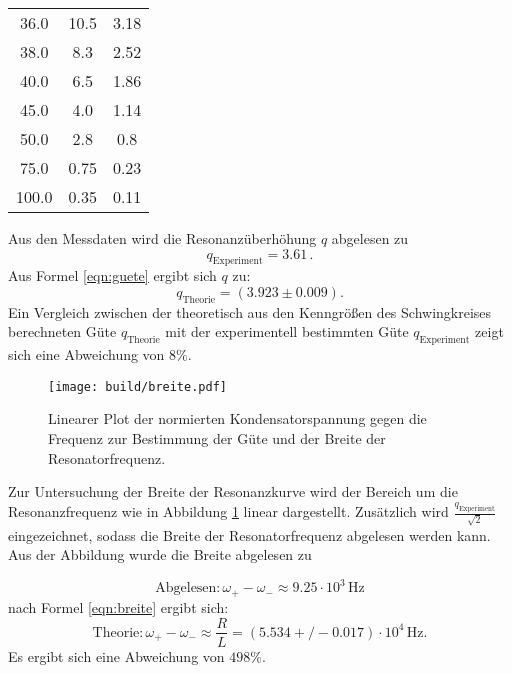 \begin{table}
\begin{tabular}{ccc}
		36.0                        & 10.5                      & 3.18                      \\
		38.0                        & 8.3                       & 2.52                      \\
		40.0                        & 6.5                       & 1.86                      \\
		45.0                        & 4.0                       & 1.14                      \\
		50.0                        & 2.8                       & 0.8                       \\
		75.0                        & 0.75                      & 0.23                      \\
		100.0                       & 0.35                      & 0.11                      \\
    \bottomrule
  \end{tabular}
\end{table}

Aus den Messdaten wird die Resonanzüberhöhung $q$ abgelesen zu
\begin{equation*}
	q_\mathrm{Experiment}= 3.61 \, .
\end{equation*}
Aus Formel \eqref{eqn:guete} ergibt sich $q$ zu:
\begin{equation*}
q_\mathrm{Theorie}= (3.923 \pm 0.009) .
\end{equation*}
Ein Vergleich zwischen der theoretisch aus den Kenngrößen des Schwingkreises berechneten Güte $q_\mathrm{Theorie}$ mit der experimentell bestimmten Güte $q_\mathrm{Experiment}$ zeigt sich eine Abweichung von $8\%$.
\begin{figure}
  \texttt{[image: build/breite.pdf]}
  \caption{Linearer Plot der normierten Kondensatorspannung gegen die Frequenz zur Bestimmung der Güte und der Breite der Resonatorfrequenz.}
  \label{fig:breite}
\end{figure}
Zur Untersuchung der Breite der Resonanzkurve wird der Bereich um die Resonanzfrequenz
wie in Abbildung \ref{fig:breite} linear dargestellt.
Zusätzlich wird $\frac{q_\mathrm{Experiment}}{\sqrt{2}}$ eingezeichnet, sodass die Breite der Resonatorfrequenz abgelesen werden kann.
Aus der Abbildung wurde die Breite abgelesen zu

\begin{equation*}
  	\text{Abgelesen}: \omega_+ - \omega_- \approx 9.25 \cdot 10^{3} \,\si{\Hz}
\end{equation*}
nach Formel \eqref{eqn:breite} ergibt sich:
\begin{equation*}
  \text{Theorie}: 	\omega_+ - \omega_- \approx \frac{R}{L}=(5.534+/-0.017) \cdot 10^{4} \,\si{\Hz} .
\end{equation*}
Es ergibt sich eine Abweichung von $ 498 \%$.
